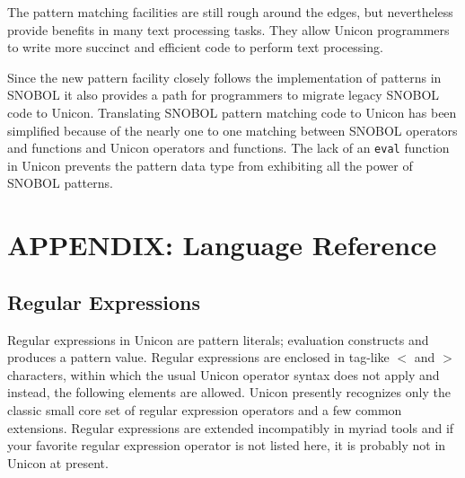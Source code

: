\documentclass[letterpaper,12pt]{article}
\begin{document}
{The pattern matching facilities are still rough around the edges, but
nevertheless provide benefits in many text processing tasks. They
allow Unicon programmers to write more succinct and efficient code to
perform text processing.

Since the new pattern facility closely follows the implementation of
patterns in SNOBOL it also provides a path for programmers to
migrate legacy SNOBOL code to Unicon. Translating SNOBOL pattern
matching code to Unicon has been simplified because of the
nearly one to one matching between SNOBOL operators and functions and
Unicon operators and functions. The lack of an {\tt eval} function in
Unicon prevents the pattern data type from exhibiting all the power
of SNOBOL patterns.


%
%

\appendix

\section*{APPENDIX: Language Reference}
\thispagestyle{empty}

\subsection*{Regular Expressions}

Regular expressions in Unicon are pattern literals; evaluation
constructs and produces a pattern value.  Regular expressions
are enclosed in tag-like $<$ and $>$ characters, within which
the usual Unicon operator syntax does not apply and instead,
the following elements are allowed.  Unicon presently
recognizes only the classic small core set of regular
expression operators and a few common extensions.
Regular expressions are extended incompatibly in myriad tools and 
if your favorite regular expression operator is not listed here,
it is probably not in Unicon at present.


}
\end{document}
